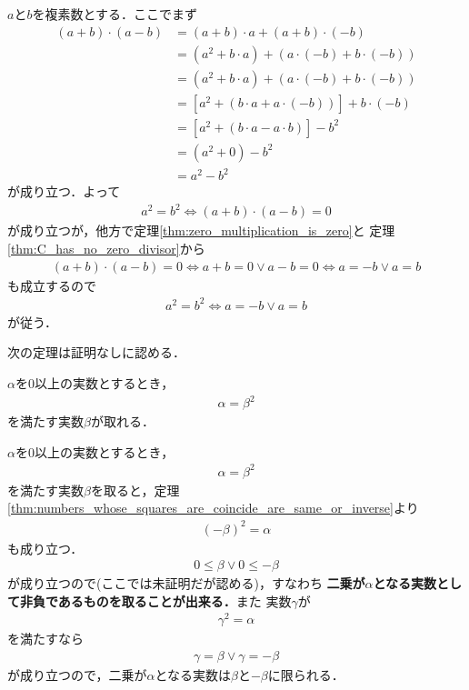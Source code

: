 	\begin{sketch}
		$a$と$b$を複素数とする．ここでまず
		\begin{align}
			(a + b) \cdot (a - b)
			&= (a+b) \cdot a + (a+b) \cdot (-b) \\
			&= (a^2 + b \cdot a) + \left(a \cdot (-b) + b \cdot (-b)\right) \\
			&= (a^2 + b \cdot a) + \left(a \cdot (-b) + b \cdot (-b)\right) \\
			&= \left[a^2 + (b \cdot a + a \cdot (-b)) \right] + b \cdot (-b) \\
			&= \left[a^2 + (b \cdot a - a \cdot b) \right] - b^2 \\
			&= (a^2 + 0) - b^2 \\
			&= a^2 - b^2
		\end{align}
		が成り立つ．よって
		\begin{align}
			a^2 = b^2 \Longleftrightarrow (a + b) \cdot (a - b) = 0
		\end{align}
		が成り立つが，他方で定理\ref{thm:zero_multiplication_is_zero}と
		定理\ref{thm:C_has_no_zero_divisor}から
		\begin{align}
			(a + b) \cdot (a - b) = 0
			\Longleftrightarrow a+b = 0 \vee a - b = 0
			\Longleftrightarrow a = -b \vee a = b
		\end{align}
		も成立するので
		\begin{align}
			a^2 = b^2 \Longleftrightarrow a = -b \vee a = b
		\end{align}
		が従う．
		\QED
	\end{sketch}
	
	次の定理は証明なしに認める．
	\begin{screen}
		\begin{thm}[非負実数には平方根が存在する]
			$\alpha$を$0$以上の実数とするとき，
			\begin{align}
				\alpha = \beta^2
			\end{align}
			を満たす実数$\beta$が取れる．
		\end{thm}
	\end{screen}
	
	$\alpha$を$0$以上の実数とするとき，
	\begin{align}
		\alpha = \beta^2
	\end{align}
	を満たす実数$\beta$を取ると，定理\ref{thm:numbers_whose_squares_are_coincide_are_same_or_inverse}より
	\begin{align}
		(-\beta)^2 = \alpha
	\end{align}
	も成り立つ．
	\begin{align}
		0 \leq \beta \vee 0 \leq -\beta
	\end{align}
	が成り立つので(ここでは未証明だが認める)，すなわち
	{\bf 二乗が$\alpha$となる実数として非負であるものを取ることが出来る．}また
	実数$\gamma$が
	\begin{align}
		\gamma^2 = \alpha
	\end{align}
	を満たすなら
	\begin{align}
		\gamma = \beta \vee \gamma = -\beta
	\end{align}
	が成り立つので，二乗が$\alpha$となる実数は$\beta$と$-\beta$に限られる．
	
